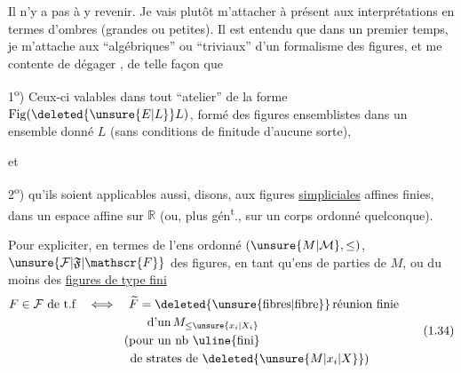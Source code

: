 
Il n'y a pas à y revenir. Je vais plutôt m'attacher à présent aux interprétations en termes d'ombres (grandes ou petites). Il est entendu que dans un premier temps, je m'attache aux  ``algébriques'' ou ``triviaux'' d'un formalisme des figures, et me contente de dégager   , de telle façon que

1\textsuperscript{o}) Ceux-ci  valables dans tout ``atelier'' de la forme $\mathrm{Fig}(\deleted{\unsure{E|L}}L)$, formé des figures ensemblistes dans un ensemble donné $L$ (sans conditions de finitude d'aucune sorte),

et

2\textsuperscript{o}) qu'ils soient applicables aussi, disons, aux figures \uline{simpliciales} affines finies, dans un espace affine sur $\mathbb{R}$ (ou, plus gén\textsuperscript{t}., sur un corps ordonné quelconque).

Pour expliciter, en termes de l'ens ordonné $(\unsure{M|\mathcal{M}},\leq)$,  $\unsure{\mathcal{F}|\mathfrak{F}|\mathscr{F}}$ des figures, en tant qu'ens de parties de $M$,  ou du moins des \uline{figures de type fini}
\[
\begin{aligned}
 F\in\mathcal{F}\ \text{de t.f} \quad&\Longleftrightarrow\quad
 \widetilde F=\deleted{\unsure{\text{fibres}|\text{fibre}}}\,\text{réunion finie}\\
 &\hspace{4.9em}\text{d'un}\,M_{\leq \unsure{x_i|X_i}}\\
 &\hspace{3.0em}\text{(pour un nb \uline{fini}}\\
 &\hspace{3.5em}\text{de strates de }\deleted{\unsure{M|x_i|X}}\text{)}
\end{aligned}
\tag*{(1.34)}
\]
